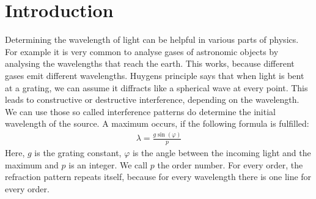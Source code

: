 \section{Introduction}

Determining the wavelength of light can be helpful in various parts of physics.
For example it is very common to analyse gases of astronomic objects by analysing the wavelengths that reach the earth.
This works, because different gases emit different wavelengths.
Huygens principle says that when light is bent at a grating, we can assume it diffracts like a spherical wave at every point.
This leads to constructive or destructive interference, depending on the wavelength.
We can use those so called interference patterns do determine the initial wavelength of the source.
A maximum occurs, if the following formula is fulfilled:
\begin{align}
	\lambda = \frac{g \sin(\varphi)}{p}
	\label{eq::wavelength}
\end{align}
Here, $g$ is the grating constant, $\varphi$ is the angle between the incoming light and the maximum and $p$ is an integer.
We call $p$ the order number.
For every order, the refraction pattern repeats itself, because for every wavelength there is one line for every order.
